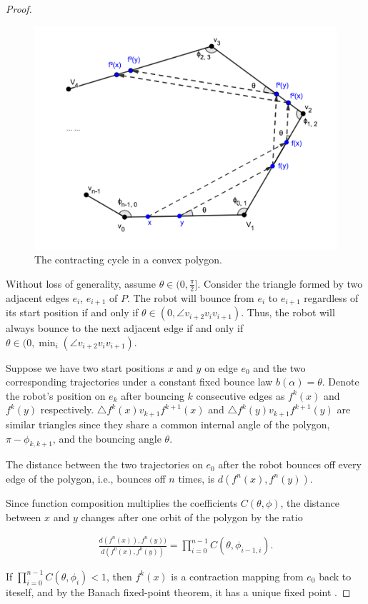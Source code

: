 \documentclass[]{styles/svproc}  %
\begin{document}
\begin{proof}
\begin{figure}
    \includegraphics[width=0.6\linewidth]{figures/convex_cycle.png}
    \centering
    \caption{The contracting cycle in a convex polygon.\label{fig:conv_cycle}}
    \centering
\end{figure}
Without loss of generality, assume $\theta \in (0, \frac{\pi}{2}]$. Consider the
triangle formed by two adjacent edges $e_i$, $e_{i+1}$ of $P$. The robot will
bounce from $e_i$ to $e_{i+1}$ regardless of its start position if and only if
$\theta \in (0, \angle v_{i+2}v_{i}v_{i+1})$. Thus, the robot will always bounce
to the next adjacent edge if and only if
$\theta \in (0, \min_{i}(\angle v_{i+2}v_{i}v_{i+1})$.

Suppose we have two start positions $x$ and $y$ on edge $e_0$ and the two
corresponding trajectories under a constant fixed bounce law $b(\alpha) = \theta$. Denote the robot's
position on $e_k$ after bouncing $k$ consecutive edges as $f^{k}(x)$ and
$f^{k}(y)$ respectively. $\triangle f^{k}(x)v_{k+1}f^{k+1}(x)$ and
$\triangle f^{k}(y)v_{k+1}f^{k+1}(y)$ are similar triangles since they share a
common internal angle of the polygon, $\pi - \phi_{k,k+1}$, and the bouncing angle
$\theta$.

The distance between the two trajectories on $e_0$ after the robot bounces off
every edge of the polygon, i.e., bounces off $n$ times, is
$d(f^{n}(x), f^{n}(y))$.

Since function composition multiplies the coefficients $C(\theta, \phi)$, 
the distance between $x$ and $y$ changes after one orbit of the polygon by the
ratio

\begin{eqnarray*}
\frac{d(f^{n}(x)), f^{n}(y))}{d(f^{0}(x), f^{0}(y))} = \prod_{i = 0}^{n-1}
C(\theta, \phi_{i-1, i}).
\end{eqnarray*}

If $\prod_{i = 0}^{n-1} C(\theta, \phi_{i}) < 1$, then $f^k(x)$ is a contraction
mapping from $e_0$ back to iteself, and by the Banach fixed-point theorem, it
has a unique fixed point \cite{Granas2003}.


\end{proof}
\end{document}
